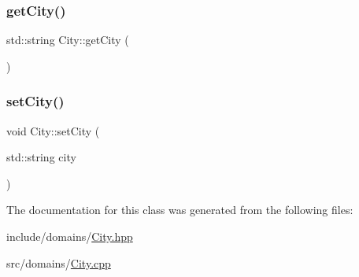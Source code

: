 \subsubsection{\texorpdfstring{getCity()}{getCity()}}
{\footnotesize\ttfamily std\+::string City\+::get\+City (\begin{DoxyParamCaption}{ }\end{DoxyParamCaption})}

\mbox{\label{class_city_a9f2a2f59076c2ec2591d3713e8ee29c5}} 
\subsubsection{\texorpdfstring{setCity()}{setCity()}}
{\footnotesize\ttfamily void City\+::set\+City (\begin{DoxyParamCaption}\item[{std\+::string}]{city }\end{DoxyParamCaption})}



The documentation for this class was generated from the following files\+:\begin{DoxyCompactItemize}
\item 
include/domains/\mbox{\hyperlink{_city_8hpp}{City.\+hpp}}\item 
src/domains/\mbox{\hyperlink{_city_8cpp}{City.\+cpp}}\end{DoxyCompactItemize}
